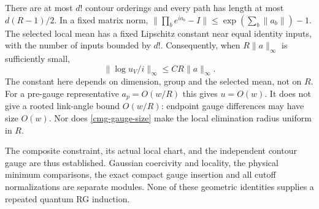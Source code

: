 There are at most $d!$ contour orderings and every path has length
at most $d(R-1)/2$. In a fixed matrix norm,
$\lVert\prod_b e^{ia_b}-I\rVert\le
\exp(\sum_b\lVert a_b\rVert)-1$. The selected local mean has a
fixed Lipschitz constant near equal identity inputs, with the number
of inputs bounded by $d!$. Consequently, when $R\lVert a\rVert_\infty$
is sufficiently small,
\begin{equation}
 \lVert\log u_V/i\rVert_\infty
       \le C R\lVert a\rVert_\infty.
 \label{cmg-gauge-size}
\end{equation}
The constant here depends on dimension, group and the selected mean,
not on $R$. For a pre-gauge representative
$a_p=O(w/R)$ this gives $u=O(w)$. It does not give a rooted link-angle
bound $O(w/R)$: endpoint gauge differences may have size $O(w)$.
Nor does \eqref{cmg-gauge-size} make the local elimination radius
uniform in $R$.

The composite constraint, its actual local chart, and the independent
contour gauge are thus established. Gaussian coercivity and locality,
the physical minimum comparisons, the exact compact gauge insertion
and all cutoff normalizations are separate modules. None of these
geometric identities supplies a repeated quantum RG induction.
